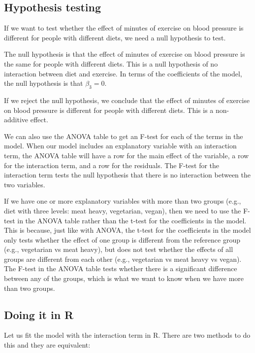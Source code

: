 \documentclass[
  letterpaper,
  8pt,
  a4paper]{book}
\begin{document}
\subsection*{Hypothesis testing}\label{hypothesis-testing}

If we want to test whether the effect of minutes of exercise on blood
pressure is different for people with different diets, we need a null
hypothesis to test.

The null hypothesis is that the effect of minutes of exercise on blood
pressure is the same for people with different diets. This is a null
hypothesis of no interaction between diet and exercise. In terms of the
coefficients of the model, the null hypothesis is that \(\beta_3 = 0\).

If we reject the null hypothesis, we conclude that the effect of minutes
of exercise on blood pressure is different for people with different
diets. This is a non-additive effect.

We can also use the ANOVA table to get an F-test for each of the terms
in the model. When our model includes an explanatory variable with an
interaction term, the ANOVA table will have a row for the main effect of
the variable, a row for the interaction term, and a row for the
residuals. The F-test for the interaction term tests the null hypothesis
that there is no interaction between the two variables.

If we have one or more explanatory variables with more than two groups
(e.g., diet with three levels: meat heavy, vegetarian, vegan), then we
need to use the F-test in the ANOVA table rather than the t-test for the
coefficients in the model. This is because, just like with ANOVA, the
t-test for the coefficients in the model only tests whether the effect
of one group is different from the reference group (e.g., vegetarian vs
meat heavy), but does not test whether the effects of all groups are
different from each other (e.g., vegetarian vs meat heavy vs vegan). The
F-test in the ANOVA table tests whether there is a significant
difference between any of the groups, which is what we want to know when
we have more than two groups.

\subsection*{Doing it in R}\label{doing-it-in-r}

Let us fit the model with the interaction term in R. There are two
methods to do this and they are equivalent:
\end{document}
